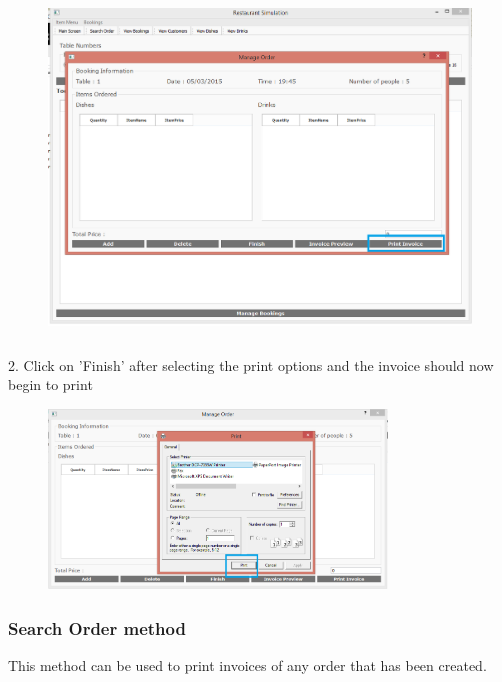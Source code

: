\begin{figure}[H]
    \includegraphics[height = 9cm]{./Manual/images/PrintInvoice1} 
    \caption{} \label{fig:printinvoice1}
\end{figure}

2. Click on 'Finish' after selecting the print options and the invoice should now begin to print
 
\begin{figure}[H]
    \includegraphics[width = 9cm]{./Manual/images/PrintInvoice2} 
    \caption{} \label{fig:printinvoice2}
\end{figure}

\subsubsection{Search Order method}
This method can be used to print invoices of any order that has been created.

